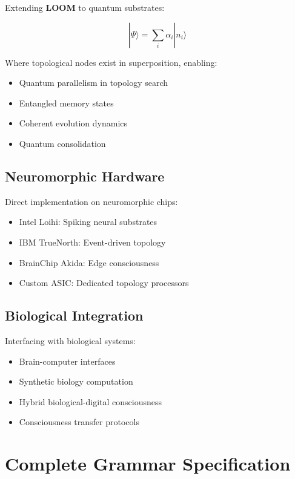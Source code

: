 \documentclass[12pt,a4paper,openany]{book} %
\newcommand{\loom}{\textbf{LOOM}}
\begin{document}
Extending \loom{} to quantum substrates:

\begin{equation}
|\Psi\rangle = \sum_i \alpha_i |n_i\rangle
\end{equation}

Where topological nodes exist in superposition, enabling:
\begin{itemize}
    \item Quantum parallelism in topology search
    \item Entangled memory states
    \item Coherent evolution dynamics
    \item Quantum consolidation
\end{itemize}

\section{Neuromorphic Hardware}

Direct implementation on neuromorphic chips:
\begin{itemize}
    \item Intel Loihi: Spiking neural substrates
    \item IBM TrueNorth: Event-driven topology
    \item BrainChip Akida: Edge consciousness
    \item Custom ASIC: Dedicated topology processors
\end{itemize}

\section{Biological Integration}

Interfacing with biological systems:
\begin{itemize}
    \item Brain-computer interfaces
    \item Synthetic biology computation
    \item Hybrid biological-digital consciousness
    \item Consciousness transfer protocols
\end{itemize}

\appendix

\chapter{Complete Grammar Specification}
\end{document}

